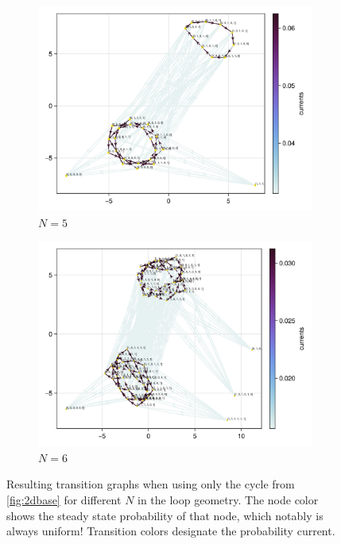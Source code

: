 \documentclass[11pt]{article}
\begin{document}
\begin{tcolorbox}
\begin{figure}[H]
\begin{subfigure}[t]{0.49\textwidth}
        \end{subfigure}
        \begin{subfigure}[t]{0.49\textwidth}
            \centering
            \includegraphics[width=\textwidth]{../../plots/ones/c1/spring_N=5_metadata=(chash=5795298381321907906,ctype=simple).png}
            \caption{$N=5$}
        \end{subfigure}
        \begin{subfigure}[t]{0.49\textwidth}
            \centering
            \includegraphics[width=\textwidth]{../../plots/ones/c1/spring_N=6_metadata=(chash=5795298381321907906,ctype=simple).png}
            \caption{$N=6$}
        \end{subfigure}
        \caption{
            Resulting transition graphs when using only the cycle from \cref{fig:2dbase} for different $N$ in the loop geometry.
            The node color shows the steady state probability of that node, which notably is always uniform!
            Transition colors designate the probability current.
        }\label{fig:2dbase_graphs}
    \end{figure}
\end{tcolorbox}
\end{document}
